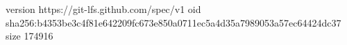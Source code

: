 version https://git-lfs.github.com/spec/v1
oid sha256:b4353be3c4f81e642209fc673e850a0711ec5a4d35a7989053a57ec64424dc37
size 174916
